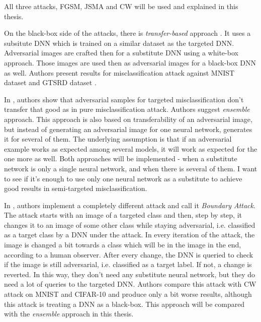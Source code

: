 All three attacks, FGSM, JSMA and CW will be used and explained in this thesis.

On the black-box side of the attacks, there is \textit{transfer-based} approach 
\cite{DBLP:journals/corr/PapernotMGJCS16}. It uses a subsitute DNN which is trained on a similar dataset as the targeted DNN. Adversarial images are crafted then for a substitute DNN using a white-box approach. Those images are used then as adversarial images for a black-box DNN as well.
Authors present results for misclassification attack against MNIST dataset and GTSRD dataset \cite{datasetGTSRD}. 

In \cite{ensemble-attack}, authors show that adversarial samples for targeted misclassification don't transfer that good as in pure misclassification attack. Authors suggest \textit{ensemble} approach. This approach is also based on transferability of an adversarial image, but instead of generating an adversarial image for one neural network, generates it for several of them. The underlying assumption is that if an adversarial example works as expected among several models, it will work as expected for the one more as well. Both approaches will be implemented - when a substitute network is only a single neural network, and when there is several of them. I want to see if it's enough to use only one neural network as a substitute to achieve good results in semi-targeted misclassification.

In \cite{brendel2018decisionbased}, authors implement a completely different attack and call it \textit{Boundary Attack}. The attack starts with an image of a targeted class and then, step by step, it changes it to an image of some other class while staying adversarial, i.e. classified as a target class by a DNN under the attack. In every iteration of the attack, the image is changed a bit towards a class which will be in the image in the end, according to a human observer. After every change, the DNN is queried to check if the image is still adversarial, i.e. classified as a target label. If not, a change is reverted. In this way, they don't need any substitute neural network, but they do need a lot of queries to the targeted DNN. Authors compare this attack with CW attack on MNIST and CIFAR-10 and produce only a bit worse results, although this attack is treating a DNN as a black-box. This approach will be compared with the \textit{ensemble} approach in this thesis.